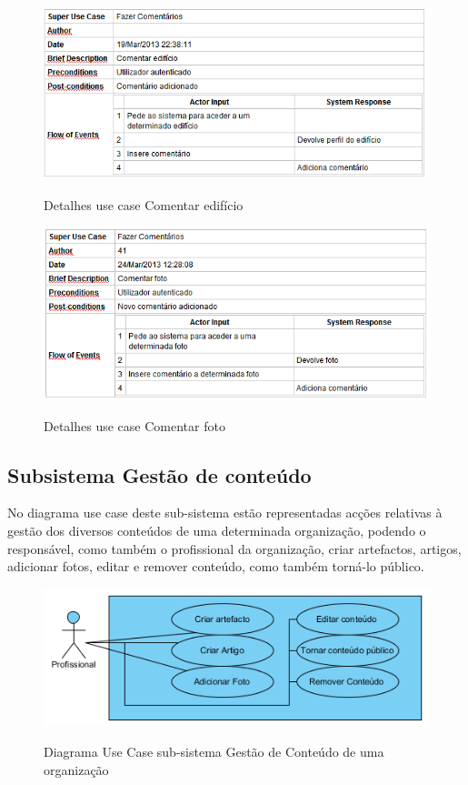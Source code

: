 ﻿\documentclass[12pt,a4paper]{article}
\begin{document}
\begin{figure}[h!]
\centering
\includegraphics[scale=0.7]{d_usecase/comentaredificio}
\label{usecase}
\caption{Detalhes use case Comentar edifício}
\end{figure}

\begin{figure}[h!]
\centering
\includegraphics[scale=0.7]{d_usecase/comentarfoto}
\label{usecase}
\caption{Detalhes use case Comentar foto}
\end{figure}

\clearpage


\subsection{Subsistema Gestão de conteúdo}
No diagrama use case deste sub-sistema estão representadas acções relativas à gestão dos diversos conteúdos de uma determinada organização, podendo o responsável, como também o profissional da organização, criar artefactos, artigos, adicionar fotos, editar e remover conteúdo, como também torná-lo público.\\

\begin{figure}[h!]
\centering
\includegraphics[scale=1]{usecase/P_GerirConteudo}
\label{usecase}
\caption{Diagrama Use Case sub-sistema Gestão de Conteúdo de uma organização}
\end{figure}
\end{document}
